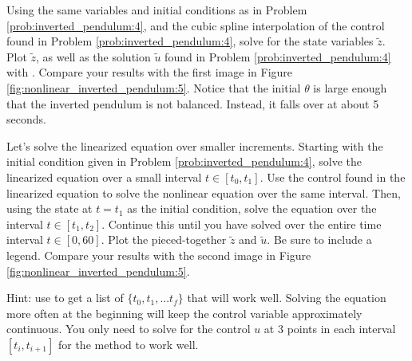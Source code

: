\begin{problem}
Using the same variables and initial conditions as in Problem \ref{prob:inverted_pendulum:4}, and the cubic spline interpolation of the control found in Problem \ref{prob:inverted_pendulum:4}, solve for the state variables $\tilde{z}$. Plot $\tilde{z}$, as well as the solution $\tilde{u}$ found in Problem \ref{prob:inverted_pendulum:4} with . Compare your results with the first image in Figure \ref{fig:nonlinear_inverted_pendulum:5}.
Notice that the initial $\theta$ is large enough that the inverted pendulum is not balanced. Instead, it falls over at about 5 seconds.


Let's solve the linearized equation over smaller increments.
Starting with the initial condition given in Problem \ref{prob:inverted_pendulum:4}, solve the linearized equation over a small interval $t\in[t_0,t_1]$.
Use the control found in the linearized equation to solve the nonlinear equation over the same interval.
Then, using the state at $t=t_1$ as the initial condition, solve the equation over the interval $t\in[t_1,t_2]$.
Continue this until you have solved over the entire time interval $t\in[0,60]$.
Plot the pieced-together $\tilde{z}$ and $\tilde{u}$.
Be sure to include a legend.
Compare your results with the second image in Figure \ref{fig:nonlinear_inverted_pendulum:5}.

Hint: use  to get a list of $\{t_0, t_1, ... t_f\}$ that will work well. Solving the equation more often at the beginning will keep the control variable approximately continuous. You only need to solve for the control $u$ at 3 points in each interval $[t_i, t_{i+1}]$ for the method to work well.

\label{prob:inverted_pendulum:5}
\end{problem}

